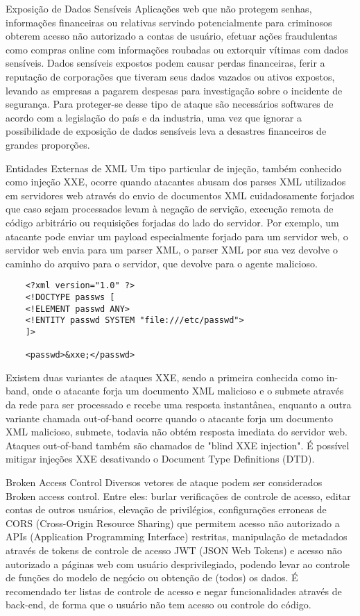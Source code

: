 Exposição de Dados Sensíveis
Aplicações web que não protegem senhas, informações financeiras ou relativas servindo potencialmente para criminosos obterem acesso não autorizado a contas de usuário, efetuar ações fraudulentas como compras online com informações roubadas ou extorquir vítimas com dados sensíveis. Dados sensíveis expostos podem causar perdas financeiras, ferir a reputação de corporações que tiveram seus dados vazados ou ativos expostos, levando as empresas a pagarem despesas para investigação sobre o incidente de segurança. Para proteger-se desse tipo de ataque são necessários softwares de acordo com a legislação do país e da industria, uma vez que ignorar a possibilidade de exposição de dados sensíveis leva a desastres financeiros de grandes proporções. 

Entidades Externas de XML
Um tipo particular de injeção, também conhecido como injeção XXE, ocorre quando atacantes abusam dos parses XML utilizados em servidores web através do envio de documentos XML cuidadosamente forjados que caso sejam processados levam à negação de servição, execução remota de código arbitrário ou requisições forjadas do lado do servidor.
Por exemplo, um atacante pode enviar um payload especialmente forjado para um servidor web, o servidor web envia para um parser XML, o parser XML por sua vez devolve o caminho do arquivo para o servidor, que devolve para o agente malicioso.

\begin{verbatim}
    <?xml version="1.0" ?>
    <!DOCTYPE passws [
    <!ELEMENT passwd ANY>
    <!ENTITY passwd SYSTEM "file:///etc/passwd">
    ]>

    <passwd>&xxe;</passwd>
\end{verbatim}

Existem duas variantes de ataques XXE, sendo a primeira conhecida como in-band, onde o atacante forja um documento XML malicioso e o submete através da rede para ser processado e recebe uma resposta instantânea, enquanto a outra variante chamada out-of-band ocorre quando o atacante forja um documento XML malicioso, submete, todavia não obtém resposta imediata do servidor web. Ataques out-of-band também são chamados de "blind XXE injection".
É possível mitigar injeções XXE desativando o Document Type Definitions (DTD). 

Broken Access Control
Diversos vetores de ataque podem ser considerados Broken access control. Entre eles: burlar verificações de controle de acesso, editar contas de outros usuários, elevação de privilégios, configurações erroneas de CORS (Cross-Origin Resource Sharing) que permitem acesso não autorizado a APIs (Application Programming Interface) restritas, manipulação de metadados através de tokens de controle de acesso JWT (JSON Web Tokens) e acesso não autorizado a páginas web com usuário desprivilegiado, podendo levar ao controle de funções do modelo de negócio ou obtenção de (todos) os dados.
É recomendado ter listas de controle de acesso e negar funcionalidades através de back-end, de forma que o usuário não tem acesso ou controle do código.

